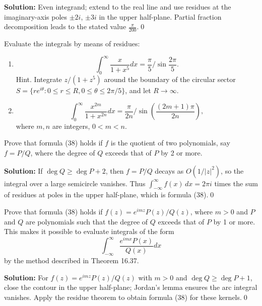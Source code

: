 \bigskip\noindent\textbf{Solution:}
Even integrand; extend to the real line and use residues at the imaginary-axis poles $\pm2i$, $\pm3i$ in the upper half-plane. Partial fraction decomposition leads to the stated value $\frac{\pi}{200}$.\qed


\begin{problembox}
Evaluate the integrals by means of residues:
\begin{enumerate}[label=(\alph*)]
\item \[ \int_0^{\infty} \frac{x}{1 + x^5} dx = \frac{\pi}{5} / \sin \frac{2\pi}{5}. \]
Hint. Integrate \( z / (1 + z^5) \) around the boundary of the circular sector \( S = \{ r e^{i\theta} : 0 \leq r \leq R, 0 \leq \theta \leq 2\pi / 5 \} \), and let \( R \to \infty \).
\item \[ \int_0^{\infty} \frac{x^{2m}}{1 + x^{2n}} dx = \frac{\pi}{2n}/ \sin \left( \frac{(2m + 1) \pi}{2n} \right), \]
where \( m, n \) are integers, \( 0 < m < n \).
\end{enumerate}
\end{problembox}





\begin{problembox}
Prove that formula (38) holds if \( f \) is the quotient of two polynomials, say \( f = P/Q \), where the degree of \( Q \) exceeds that of \( P \) by 2 or more.
\end{problembox}

\bigskip\noindent\textbf{Solution:}
If $\deg Q\ge \deg P+2$, then $f=P/Q$ decays as $O(1/|z|^2)$, so the integral over a large semicircle vanishes. Thus $\int_{-\infty}^{\infty} f(x)\,dx=2\pi i$ times the sum of residues at poles in the upper half-plane, which is formula (38).\qed


\begin{problembox}
Prove that formula (38) holds if \( f(z) = e^{imz} P(z) / Q(z) \), where \( m > 0 \) and \( P \) and \( Q \) are polynomials such that the degree of \( Q \) exceeds that of \( P \) by 1 or more. This makes it possible to evaluate integrals of the form
\[ \int_{-\infty}^{\infty} \frac{e^{imx} P(x)}{Q(x)} dx \]
by the method described in Theorem 16.37.
\end{problembox}

\bigskip\noindent\textbf{Solution:}
For $f(z)=e^{imz}P(z)/Q(z)$ with $m>0$ and $\deg Q\ge \deg P+1$, close the contour in the upper half-plane; Jordan's lemma ensures the arc integral vanishes. Apply the residue theorem to obtain formula (38) for these kernels.\qed


